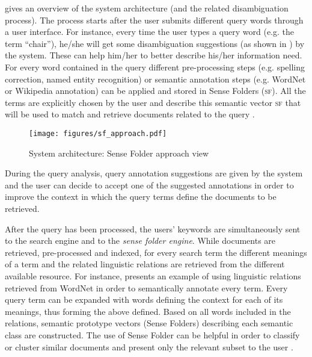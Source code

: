 \documentclass[output=paper]{LSP/langsci}
\begin{document}
 gives an overview of the system architecture (and the related disambiguation process). The process starts after the user submits different query words through a user interface. For instance, every time the user types a query word (e.g. the term ``chair''), he/she will get some disambiguation suggestions (as shown in ) by the system. These can help him/her to better describe his/her information need. For every word contained in the query different pre-processing steps (e.g. spelling correction, named entity recognition) or semantic annotation steps (e.g. WordNet or Wikipedia annotation) can be applied and stored in Sense Folders (\textsc{sf}). All the terms are explicitly chosen by the user and describe this semantic vector \textsc{sf} that will be used to match and retrieve documents related to the query \citet{DeL10}.\par

\begin{figure} 
	\texttt{[image: figures/sf\_approach.pdf]}
	\caption{System architecture: Sense Folder approach view}
	\label{fig_SFArchi}
\end{figure} 

During the query analysis, query annotation suggestions are given by the system and the user can decide to accept one of the suggested annotations in order to improve the context in which the query terms define the documents to be retrieved.\par

After the query has been processed, the users' keywords are simultaneously sent to the search engine and to the \textit{sense folder engine}. While documents are retrieved, pre-processed and indexed, for every search term the different meanings of a term  and the related linguistic relations are retrieved from the different available resource. For instance,  presents an example of using linguistic relations retrieved from WordNet in order to semantically annotate every term. Every query term can be expanded with words defining the context for each of its meanings, thus forming the above defined.  
Based on all words included in the relations, semantic prototype vectors (Sense Folders) describing each semantic class are constructed. The use of Sense Folder can be helpful in order to classify or cluster similar documents and present only the relevant subset to the user \citet{del08book}.
\end{document}
